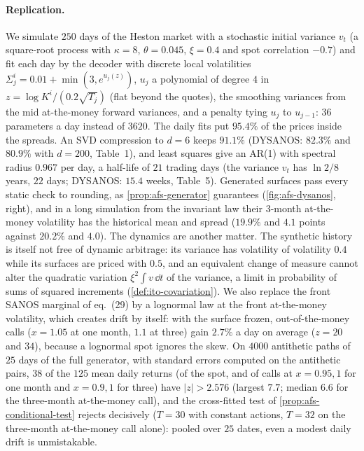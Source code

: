 \paragraph{Replication.} We simulate $250$ days of the Heston market with a stochastic initial variance $v_t$ (a square-root process
with $\kappa=8$, $\theta=0.045$, $\xi=0.4$ and spot correlation $-0.7$) and fit each day by the decoder with discrete local volatilities
$\Sigma_j^i=0.01+\min(3,e^{u_j(z)})$, $u_j$ a polynomial of degree $4$ in $z=\log K^i/(0.2\sqrt{T_j})$ (flat beyond the quotes), the smoothing
variances from the mid at-the-money forward variances, and a penalty tying $u_j$ to $u_{j-1}$: $36$ parameters a day instead of
$3620$. The daily fits put $95.4\%$ of the prices inside the spreads. An SVD compression to $d=6$ keeps $91.1\%$ (DYSANOS: $82.3\%$ and
$80.9\%$ with $d=200$, Table~1), and least squares give an AR(1) with spectral radius $0.967$ per day, a half-life of $21$ trading days
(the variance $v_t$ has $\ln2/8$ years, $22$ days; DYSANOS: $15.4$ weeks, Table~5). Generated surfaces pass every static check to
rounding, as \cref{prop:afs-generator} guarantees (\cref{fig:afs-dysanos}, right), and in a long simulation from the invariant law
their 3-month at-the-money volatility has the historical mean and spread ($19.9\%$ and $4.1$ points against $20.2\%$ and $4.0$).
The dynamics are another matter. The synthetic history is itself not free of dynamic arbitrage: its variance has volatility of
volatility $0.4$ while its surfaces are priced with $0.5$, and an equivalent change of measure cannot alter the quadratic
variation $\xi^2\int v\,\dd t$ of the variance, a limit in probability of sums of squared increments (\cref{def:ito-covariation}). We also replace the front SANOS marginal of eq.~(29) by a lognormal law at the front at-the-money
volatility, which creates drift by itself: with the surface frozen, out-of-the-money calls ($x=1.05$ at one month, $1.1$ at three) gain
$2.7\%$ a day on average ($z=20$ and $34$), because a lognormal spot ignores the skew. On $4000$ antithetic paths of $25$ days of the
full generator, with standard errors computed on the antithetic pairs, $38$ of the $125$ mean daily returns (of the spot, and of calls at
$x=0.95,1$ for one month and $x=0.9,1$ for three) have $|z|>2.576$ (largest $7.7$; median $6.6$ for the three-month at-the-money call), and
the cross-fitted test of \cref{prop:afs-conditional-test} rejects decisively ($T=30$ with constant actions, $T=32$ on the three-month
at-the-money call alone): pooled over $25$ dates, even a modest daily drift is unmistakable.

